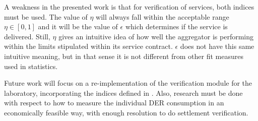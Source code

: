 A weakness in the presented work is that for verification of services, both indices must be used. The value of $\eta$ will always fall within the acceptable range $\eta \in [0,1]$ and it will be the value of $\epsilon$ which determines if the service is delivered. Still, $\eta$ gives an intuitive idea of how well the aggregator is performing within the limits stipulated within its service contract. $\epsilon$ does not have this same intuitive meaning, but in that sense it is not different from other fit measures used in statistics.

Future work will focus on a re-implementation of the verification module for the laboratory, incorporating the indices defined in \cite{bondy2016method}. Also, research must be done with respect to how to measure the individual DER consumption in an economically feasible way, with enough resolution to do settlement verification.


